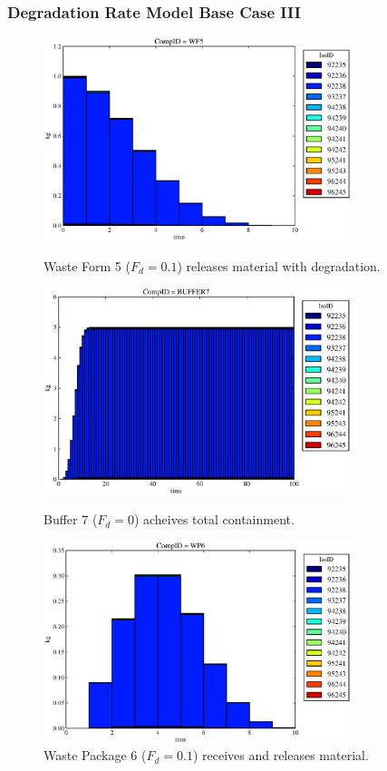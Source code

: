 \begin{frame}
  \frametitle{Degradation Rate Model Base Case III}
  \begin{figure}
\begin{minipage}[b]{0.45\linewidth}

  \includegraphics[width=0.8\textwidth]{./images/drIII1.eps}
  \caption[DRIII Waste Form Contaminants.]{
    Waste Form 5 ($F_d = 0.1$) releases material with degradation. 
    }
  \label{fig:drIIIwf5}
  
  \includegraphics[width=0.8\textwidth]{./images/drIII3.eps}
  \caption[Case DRIII Buffer Contaminants]{
    Buffer 7 ($F_d=0$) acheives total containment.
    }
  \label{fig:drIIIbuff}

\end{minipage}
\hspace{0.05\linewidth}
\begin{minipage}[b]{0.45\linewidth}
  \includegraphics[width=0.8\textwidth]{./images/drIII2.eps}
  \caption[Case DRIII Waste Package Contaminants.]{ 
    Waste Package 6 ($F_d = 0.1$) receives and releases material. 
    }
  \label{fig:drIIIwp6}


\end{minipage}
\end{figure}
\end{frame}
